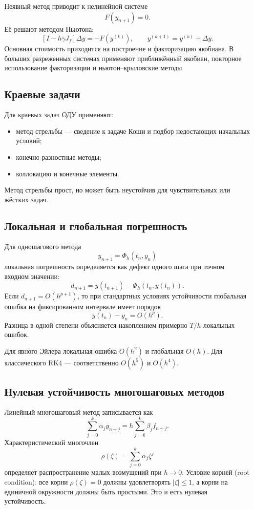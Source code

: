 Неявный метод приводит к нелинейной системе
\[
    F(y_{n+1})=0.
\]
Её решают методом Ньютона:
\[
    \left[I-h\gamma J_f\right]\Delta y=-F(y^{(k)}),
    \qquad
    y^{(k+1)}=y^{(k)}+\Delta y.
\]
Основная стоимость приходится на построение и факторизацию якобиана. В больших
разреженных системах применяют приближённый якобиан, повторное использование
факторизации и ньютон--крыловские методы.

\subsection{Краевые задачи}

Для краевых задач ОДУ применяют:
\begin{itemize}
    \item метод стрельбы --- сведение к задаче Коши и подбор недостающих
          начальных условий;
    \item конечно-разностные методы;
    \item коллокацию и конечные элементы.
\end{itemize}
Метод стрельбы прост, но может быть неустойчив для чувствительных или жёстких
задач.

\subsection{Локальная и глобальная погрешность}

Для одношагового метода
\[
    y_{n+1}=\Phi_h(t_n,y_n)
\]
локальная погрешность определяется как дефект одного шага при точном входном значении:
\[
    d_{n+1}
    =y(t_{n+1})-\Phi_h(t_n,y(t_n)).
\]
Если $d_{n+1}=O(h^{p+1})$, то при стандартных условиях устойчивости глобальная ошибка
на фиксированном интервале имеет порядок
\[
    y(t_n)-y_n=O(h^p).
\]
Разница в одной степени объясняется накоплением примерно $T/h$ локальных ошибок.

Для явного Эйлера локальная ошибка $O(h^2)$ и глобальная $O(h)$. Для классического
RK4 --- соответственно $O(h^5)$ и $O(h^4)$.

\subsection{Нулевая устойчивость многошаговых методов}

Линейный многошаговый метод записывается как
\[
    \sum_{j=0}^{k}\alpha_j y_{n+j}
    =h\sum_{j=0}^{k}\beta_j f_{n+j}.
\]
Характеристический многочлен
\[
    \rho(\zeta)=\sum_{j=0}^{k}\alpha_j\zeta^j
\]
определяет распространение малых возмущений при $h\to0$. Условие корней (root condition):
все корни $\rho(\zeta)=0$ должны удовлетворять $|\zeta|\le1$, а корни на единичной
окружности должны быть простыми. Это и есть нулевая устойчивость.

